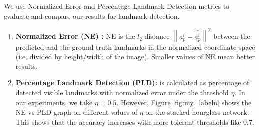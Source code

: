 \documentclass[conference]{IEEEtran}
\newcommand\norm[1]{\left\lVert#1\right\rVert}
\begin{document}
We use Normalized Error and Percentage Landmark Detection metrics to evaluate and compare our results for landmark detection. 

\begin{enumerate}

\item \textbf{Normalized Error (NE) :} NE is the $l_2$ distance  $\norm{a^{i}_{p} - \hat{a^{i}_{p}}}^2$ between the predicted and the ground truth landmarks in the normalized coordinate space (i.e. divided by height/width of the image). Smaller values of NE mean better results.
\item \textbf{Percentage Landmark Detection (PLD):} is calculated as percentage of detected visible  landmarks with normalized error under the threshold $\eta$. In our experiments, we take $\eta = 0.5$. However, Figure \ref{fig:my_labeln} shows the NE vs PLD graph on different values of $\eta$ on the stacked hourglass network. This shows that the accuracy increases with more tolerant thresholds like 0.7.   
 
 
\end{enumerate}
\end{document}
